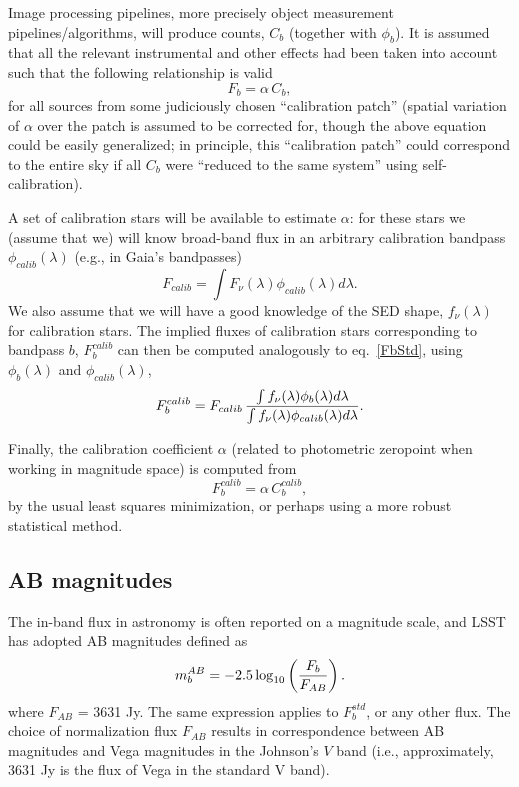 \documentclass[PST,toc]{lsstdoc}
\begin{document}
Image processing pipelines, more precisely object measurement pipelines/algorithms,
will produce counts, $C_b$ (together with $\phi_b$). It is assumed that all the relevant
instrumental and other effects had been taken into account such that the following
relationship is valid
\begin{equation}
               F_b = \alpha \,  C_b,
\end{equation}
for all sources from some judiciously chosen ``calibration patch'' (spatial variation of $\alpha$ over
the patch is assumed to be corrected for, though the above equation could be easily
generalized; in principle, this  ``calibration patch'' could correspond to the entire
sky if all $C_b$ were ``reduced to the same system'' using self-calibration).

A set of calibration stars will be available to estimate $\alpha$: for these stars
we (assume that we) will know broad-band flux in an arbitrary calibration bandpass
$\phi_{calib}(\lambda)$ (e.g., in Gaia's bandpasses)
\begin{equation}
\label{FbCalib}
             F_{calib} = \int{F_\nu(\lambda) \phi_{calib}(\lambda) d\lambda}.
\end{equation}
We also assume that we will have a good knowledge of the SED shape,
$f_\nu(\lambda)$ for calibration stars. The implied fluxes of calibration stars corresponding
to bandpass $b$, $F_b^{calib}$ can then be computed analogously to eq.~\ref{FbStd}, using
$\phi_b(\lambda)$ and $\phi_{calib}(\lambda)$,
\begin{equation}
\label{FbStdCalib}
F^{calib}_b =  F_{calib} \, {\int{f_\nu(\lambda)  \phi_b(\lambda) d\lambda }  \over   \int{ f_\nu(\lambda) \phi_{calib}(\lambda) d\lambda }}.
\end{equation}


Finally, the calibration coefficient $\alpha$ (related to photometric zeropoint when
working in magnitude space) is computed from
\begin{equation}
\label{alphaCalib}
                 F_b^{calib} = \alpha \,  C_b^{calib},
\end{equation}
by the usual least squares minimization, or perhaps using a more robust statistical method.


\subsection{AB magnitudes}
The in-band flux in astronomy is often reported on a magnitude scale, and LSST has adopted
AB magnitudes defined as
\begin{equation}
\label{ABmag}
              m^{AB}_b = -2.5\log_{10}\left({F_b \over F_{AB}}\right).
\end{equation}
where $F_{AB}$ = 3631 Jy. The same expression applies to $F^{std}_b$, or any other flux.
The choice of normalization flux $F_{AB}$ results in correspondence between AB magnitudes
and Vega magnitudes in the Johnson's $V$ band (i.e., approximately, 3631 Jy is the flux of Vega
in the standard V band).
\end{document}
